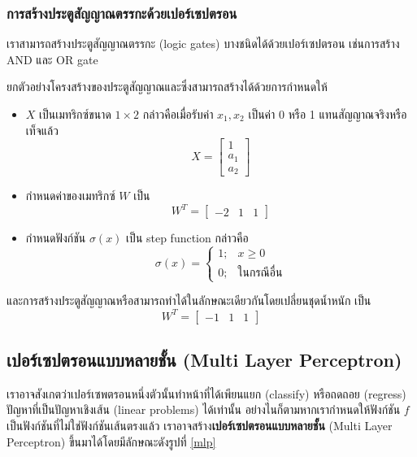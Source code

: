 \documentclass{cpereport}
\begin{document}
\subsubsection{การสร้างประตูสัญญาณตรรกะด้วยเปอร์เซปตรอน}
เราสามารถสร้างประตูสัญญาณตรรกะ (logic gates) บางชนิดได้ด้วยเปอร์เซปตรอน เช่นการสร้าง AND และ OR gate

ยกตัวอย่างโครงสร้างของประตูสัญญาณและซึ่งสามารถสร้างได้ด้วยการกำหนดให้
\begin{itemize}
    \item $X$ เป็นเมทริกซ์ขนาด $1 \times 2$ กล่าวคือเมื่อรับค่า $x_1, x_2$ เป็นค่า 0 หรือ 1 แทนสัญญาณจริงหรือเท็จแล้ว
        $$X = \begin{bmatrix}
            1 \\
            a_1 \\
            a_2
        \end{bmatrix}$$
    \item กำหนดค่าของเมทริกซ์ $W$ เป็น
        $$W^T = \begin{bmatrix}
            -2 & 1 & 1
        \end{bmatrix}$$
    \item กำหนดฟังก์ชัน $\sigma(x)$ เป็น step function กล่าวคือ
    $$
        \sigma(x) = \begin{cases}
            1; & x \geq 0\\
            0; & \textrm{ในกรณีอื่น}
        \end{cases}
    $$
\end{itemize}
และการสร้างประตูสัญญาณหรือสามารถทำได้ในลักษณะเดียวกันโดยเปลี่ยนชุดน้ำหนัก เป็น
        $$W^T = \begin{bmatrix}
            -1 & 1 & 1
        \end{bmatrix}$$

\subsection{เปอร์เซปตรอนแบบหลายชั้น (Multi Layer Perceptron)}

เราอาจสังเกตว่าเปอร์เซพตรอนหนึ่งตัวนั้นทำหน้าที่ได้เพียนแยก (classify) หรือถดถอย (regress) ปัญหาที่เป็นปัญหาเชิงเส้น (linear problems) ได้เท่านั้น อย่างไนก็ตามหากเรากำหนดให้ฟังก์ชัน $f$ เป็นฟังก์ชันที่ไม่ใช่ฟังก์ชันเส้นตรงแล้ว เราอาจสร้าง\textbf{เปอร์เซปตรอนแบบหลายชั้น} (Multi Layer Perceptron) ขึ้นมาได้โดยมีลักษณะดังรูปที่ \ref{mlp}
\end{document}
